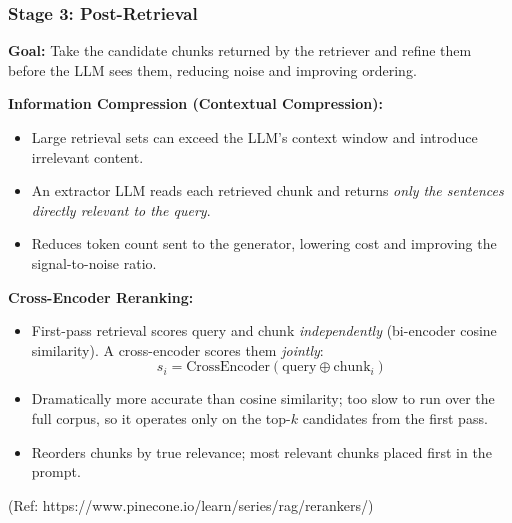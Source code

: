 \begin{frame}[fragile]\frametitle{Stage 3: Post-Retrieval}

\textbf{Goal:} Take the candidate chunks returned by the retriever and refine them before the LLM sees them, reducing noise and improving ordering.

\vspace{0.3em}
\textbf{Information Compression (Contextual Compression):}
\begin{itemize}
  \item Large retrieval sets can exceed the LLM's context window and introduce irrelevant content.
  \item An extractor LLM reads each retrieved chunk and returns \textit{only the sentences directly relevant to the query}.
  \item Reduces token count sent to the generator, lowering cost and improving the signal-to-noise ratio.
\end{itemize}

\vspace{0.3em}
\textbf{Cross-Encoder Reranking:}
\begin{itemize}
  \item First-pass retrieval scores query and chunk \textit{independently} (bi-encoder cosine similarity). A cross-encoder scores them \textit{jointly}:
    \[ s_i = \text{CrossEncoder}(\text{query} \oplus \text{chunk}_i) \]
  \item Dramatically more accurate than cosine similarity; too slow to run over the full corpus, so it operates only on the top-$k$ candidates from the first pass.
  \item Reorders chunks by true relevance; most relevant chunks placed first in the prompt.
\end{itemize}

{\tiny (Ref: https://www.pinecone.io/learn/series/rag/rerankers/)}

\end{frame}


